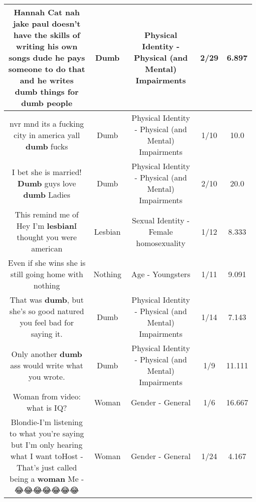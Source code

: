 \documentclass[11pt]{article}
\newlength\mylength
\begin{document}
\begin{center}
\begin{longtable}{|C{.65\mylength}|C{.30\mylength}|C{.12\mylength}|C{.12\mylength}|C{.12\mylength}|}
  \small Hannah Cat nah jake paul doesn't have the skills of writing his own songs dude he pays someone to do that and he writes \textbf{dumb} things for \textbf{dumb} people\normalsize   & Dumb & Physical Identity - Physical (and Mental) Impairments & 2/29 & 6.897 \\  \hline
  \small nvr mnd its a fucking city in america yall \textbf{dumb} fucks\normalsize   & Dumb & Physical Identity - Physical (and Mental) Impairments & 1/10 & 10.0 \\  \hline
  \small I bet she is married! \textbf{Dumb} guys love \textbf{dumb} Ladies\normalsize   & Dumb & Physical Identity - Physical (and Mental) Impairments & 2/10 & 20.0 \\  \hline
  \small This remind me of Hey I'm \textbf{lesbian}I thought you were american\normalsize   & Lesbian & Sexual Identity - Female homosexuality & 1/12 & 8.333 \\  \hline
  \small Even if she wins she is still going home with nothing\normalsize   & Nothing & Age - Youngsters & 1/11 & 9.091 \\  \hline
  \small That was \textbf{dumb}, but she's so good natured you feel bad for saying it.\normalsize   & Dumb & Physical Identity - Physical (and Mental) Impairments & 1/14 & 7.143 \\  \hline
  \small Only another \textbf{dumb} ass would write what you wrote.\normalsize   & Dumb & Physical Identity - Physical (and Mental) Impairments & 1/9 & 11.111 \\  \hline
  \small Woman from video: what is IQ?\normalsize   & Woman & Gender - General & 1/6 & 16.667 \\  \hline
  \small Blondie-I'm listening to what you're saying but I'm only hearing what I want toHost   - That's just called being a \textbf{woman} Me  -😂😂😂😂😂😂😂\normalsize   & Woman & Gender - General & 1/24 & 4.167 \\  \hline

\end{longtable}
\end{center}
\end{document}
